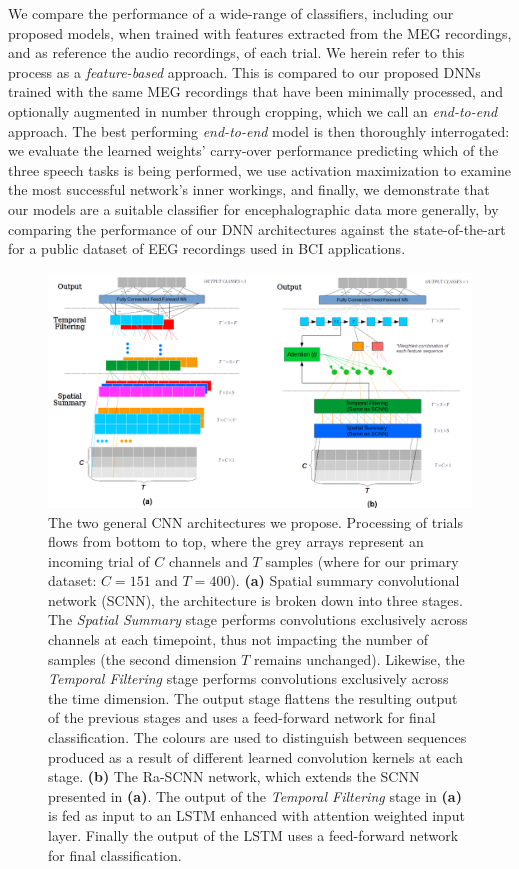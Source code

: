 \documentclass[fleqn,10pt]{wlscirep}
\begin{document}
We compare the performance of a wide-range of classifiers, including our proposed models, when trained with features extracted from the MEG recordings, and as reference the audio recordings, of each trial. We herein refer to this process as a {\em feature-based} approach. This is compared to our proposed DNNs trained with the same MEG recordings that have been minimally processed, and optionally augmented in number through cropping, which we call an {\em end-to-end} approach. The best performing {\em end-to-end} model is then thoroughly interrogated: we evaluate the learned weights' carry-over performance predicting which of the three speech tasks is being performed, we use activation maximization to examine the most successful network's inner workings, and finally, we demonstrate that our models are a suitable classifier for encephalographic data more generally, by comparing the performance of our DNN architectures against the state-of-the-art for a public dataset of EEG recordings used in BCI applications.

\begin{figure}[t]
  \centering\includegraphics[width=\linewidth]{architectures.png}
  \caption{The two general CNN architectures we propose. Processing of trials flows from bottom to top, where the grey arrays represent an incoming trial of $C$ channels and $T$ samples (where for our primary dataset: $C=151$ and $T=400$). \textbf{(a)} Spatial summary convolutional network (SCNN), the architecture is broken down into three stages. The {\em Spatial Summary} stage performs convolutions exclusively across channels at each timepoint, thus not impacting the number of samples (the second dimension $T$ remains unchanged). Likewise, the {\em Temporal Filtering} stage performs convolutions exclusively across the time dimension. The output stage flattens the resulting output of the previous stages and uses a feed-forward network for final classification. The colours are used to distinguish between sequences produced as a result of different learned convolution kernels at each stage. \textbf{(b)} The Ra-SCNN network, which extends the SCNN presented in \textbf{(a)}. The output of the {\em Temporal Filtering} stage in \textbf{(a)} is fed as input to an LSTM enhanced with attention weighted input layer. Finally the output of the LSTM uses a feed-forward network for final classification.}
  \label{fig:archs}
\end{figure}
\end{document}
